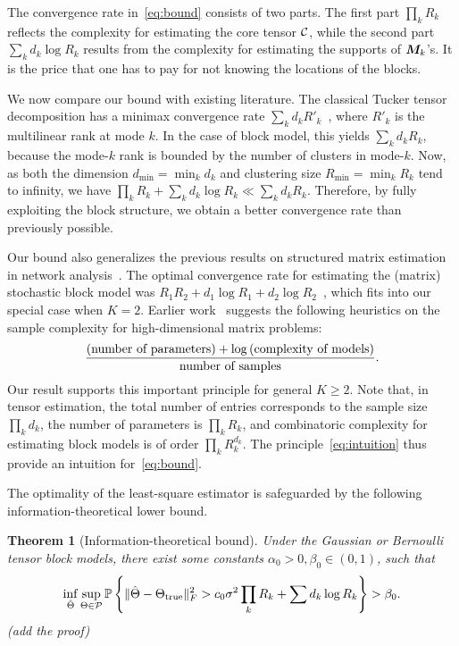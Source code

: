 \documentclass{article}
\newtheorem{theorem}{Theorem}
\begin{document}
The convergence rate in~\eqref{eq:bound} consists of two parts. The first part $\prod_k R_k$ reflects the complexity for estimating the core tensor $\mathcal{C}$, while the second part $\sum_k d_k \log R_k$ results from the complexity for estimating the supports of $\bm M_k$'s. It is the price that one has to pay for not knowing the locations of the blocks.  

We now compare our bound with existing literature. The classical Tucker tensor decomposition has a minimax convergence rate $\sum_kd_kR'_k$~\cite{zhang2018tensor}, where $R'_k$ is the multilinear rank at mode $k$. In the case of block model, this yields $\sum_kd_kR_k$, because the mode-$k$ rank is bounded by the number of clusters in mode-$k$. Now, as both the dimension $d_{\min}=\min_kd_k$ and clustering size $R_{\min}=\min_k R_k$ tend to infinity, we have $\prod_k R_k+ \sum_k d_k \log R_k\ll \sum_k d_k R_k$. Therefore, by fully exploiting the block structure, we obtain a better convergence rate than previously possible. 

Our bound also generalizes the previous results on structured matrix estimation in network analysis~\cite{gao2016optimal,gao2018minimax}. The optimal convergence rate for estimating the (matrix) stochastic block model was $R_1R_2+d_1\log R_1+d_2\log R_2$~\cite{gao2016optimal}, which fits into our special case when $K=2$. 
Earlier work~\cite{gao2018minimax} suggests the following heuristics on the sample complexity for high-dimensional matrix problems:
\begin{equation}\label{eq:intuition}
{\text{(number of parameters)}+ \log \text{(complexity of models)}\over \text{number of samples}}.
\end{equation}
Our result supports this important principle for general $K\geq 2$. Note that, in tensor estimation, the total number of entries corresponds to the sample size $\prod_k d_k$, the number of parameters is $\prod_k R_k$, and combinatoric complexity for estimating block models is of order $\prod_k R_k^{d_k}$. The principle~\eqref{eq:intuition} thus provide an intuition for~\eqref{eq:bound}. 

The optimality of the least-square estimator is safeguarded by the following information-theoretical lower bound.
\begin{theorem}[Information-theoretical bound] Under the Gaussian or Bernoulli tensor block models, there exist some constants $\alpha_0>0, \beta_0\in(0,1)$, such that
\[
\inf_{\hat \Theta}\sup_{\Theta \in \mathcal{P}}\mathbb{P}\left\{ \lVert\hat \Theta-\Theta_{\text{true}}\rVert_F^2> c_0\sigma^2 \prod_k R_k+\sum d_k \log R_k\right\}>\beta_0.
\]
(add the proof)
\end{theorem}
\end{document}
